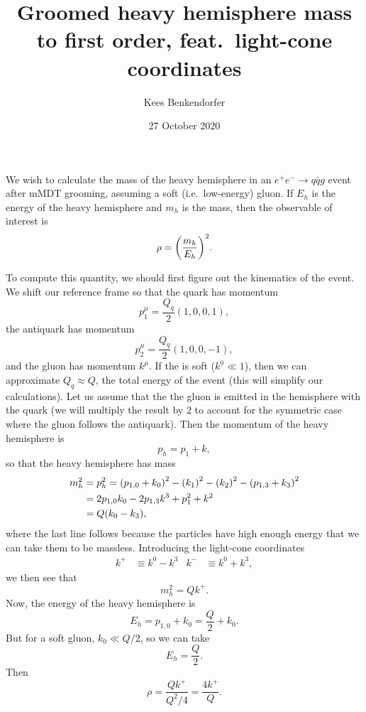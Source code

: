 \documentclass[11pt,twoside,reqno]{amsart}
\title{Groomed heavy hemisphere mass to first order, feat.\ light-cone coordinates}
\author{Kees Benkendorfer}
\date{27 October 2020}
\theoremstyle{plain}
\theoremstyle{remark}
\theoremstyle{definition}
\theoremstyle{remark}
\theoremstyle{definition}
\theoremstyle{definition}
\begin{document}
\maketitle

We wish to calculate the mass of the heavy hemisphere in an $e^+ e^- \to q\bar q g$ event after mMDT grooming, assuming a soft (i.e.\ low-energy) gluon. If $E_h$ is the energy of the heavy hemisphere and $m_h$ is the mass, then the observable of interest is \cite{larkoski_improving_2020}
\begin{equation}
	\rho = \qty(\frac{m_h}{E_h})^2.
\end{equation}

To compute this quantity, we should first figure out the kinematics of the event. We shift our reference frame so that the quark has momentum
\begin{equation}
	p_1^\mu = \frac{Q_q}{2}(1, 0, 0, 1),
\end{equation}
the antiquark has momentum
\begin{equation}
	p_2^\mu = \frac{Q_q}{2}(1, 0, 0, -1),
\end{equation}
and the gluon has momentum $k^\mu$. If the is soft ($k^0 \ll 1$), then we can approximate $Q_q \approx Q$, the total energy of the event (this will simplify our calculations). Let us assume that the the gluon is emitted in the hemisphere with the quark (we will multiply the result by $2$ to account for the symmetric case where the gluon follows the antiquark). Then the momentum of the heavy hemisphere is
\begin{equation}
	p_h = p_1 + k,
\end{equation}
so that the heavy hemisphere has mass
\begin{align}
	m_h^2 &= p_h^2 = \qty(p_{1,0} + k_0)^2 - \qty(k_1)^2  - \qty(k_2)^2 - \qty(p_{1,3} + k_3)^2 \\
	&= 2p_{1,0} k_0 - 2p_{1,3} k^3 + p_1^2 + k^2 \\
	&= Q\qty(k_0 - k_3),
\end{align}
where the last line follows because the particles have high enough energy that we can take them to be massless. Introducing the light-cone coordinates
\begin{align}\label{eq:light cone}
	k^+ &\equiv k^0 - k^3 & k^- &\equiv  k^0 + k^3,
\end{align}
we then see that
\begin{equation}
	m_h^2 = Q k^+.
\end{equation}
Now, the energy of the heavy hemisphere is
\begin{equation}
	E_h = p_{1, 0} + k_0 = \frac{Q}{2} + k_0.
\end{equation}
But for a soft gluon, $k_0 \ll Q/2$, so we can take
\begin{equation}
	E_h = \frac{Q}{2}.
\end{equation}
Then
\begin{equation}
	\rho = \frac{Q k^+}{Q^2/4} = \frac{4 k^+}{Q}.
\end{equation}
\end{document}
